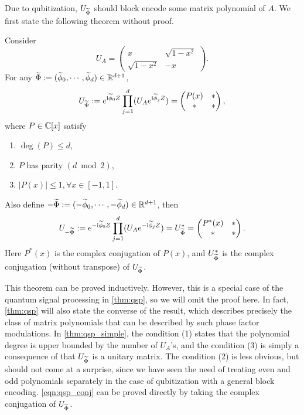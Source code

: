 Due to qubitization, $U_{\widetilde{\Phi}}$ should block encode some matrix polynomial of $A$. We first state the following theorem without proof.
\begin{thm}\label{thm:qsp_simple}
Consider 
\begin{equation}
U_A=\begin{pmatrix}
x & \sqrt{1-x^2}\\
\sqrt{1-x^2} & -x
\end{pmatrix}.
\end{equation}
For any $\widetilde{\Phi} := (\widetilde{\phi}_0, \cdots, \widetilde{\phi}_d) \in \mathbb{R}^{d+1}$,
\begin{equation}
  U_{\widetilde{\Phi}} := e^{\mathrm{i} \widetilde{\phi}_0 Z} \prod_{j=1}^d (U_A e^{\mathrm{i} \widetilde{\phi}_j Z}) = \begin{pmatrix}
P(x) & *\\
* & *
\end{pmatrix},
\end{equation}
where $P\in\mathbb{C}[x]$ satisfy
\begin{enumerate}

\item $\deg(P) \leq d$,

\item $P$ has parity $(d \bmod 2)$, 

\item $|P(x)|\le 1, \forall x \in [-1, 1]$.
\end{enumerate}
Also define $-\widetilde{\Phi} := (-\widetilde{\phi}_0, \cdots, -\widetilde{\phi}_d) \in \mathbb{R}^{d+1}$, then
\begin{equation}\label{eqn:qsp_conj}
  U_{-\widetilde{\Phi}} := e^{-\mathrm{i} \widetilde{\phi}_0 Z} \prod_{j=1}^d (U_A e^{-\mathrm{i} \widetilde{\phi}_j Z}) = U^*_{\widetilde{\Phi}}= \begin{pmatrix}
P^*(x) & *\\
* & *
\end{pmatrix}.
\end{equation}
Here $P^*(x)$ is the complex conjugation of $P(x)$, and $U^*_{\widetilde{\Phi}}$ is the complex conjugation (without transpose) of $U_{\widetilde{\Phi}}$.
\end{thm}

\begin{rem}
This theorem can be proved inductively. However, this is a special case of the quantum signal processing in \cref{thm:qsp}, so we will omit the proof here. In fact, \cref{thm:qsp} will also state the converse of the result, which describes precisely the class of matrix polynomials that can be described by such phase factor modulations. 
In \cref{thm:qsp_simple}, the condition (1) states that the polynomial degree is upper bounded by the number of $U_A$'s, and the condition (3) is simply a consequence of that $U_{\widetilde{\Phi}}$ is a unitary matrix. 
The condition (2) is less obvious, but should not come at a surprise, since we have seen the need of treating even and odd polynomials separately in the case of qubitization with a general block encoding.
\cref{eqn:qsp_conj} can be proved directly by taking the complex conjugation of $U_{\widetilde{\Phi}}$.
\end{rem}


